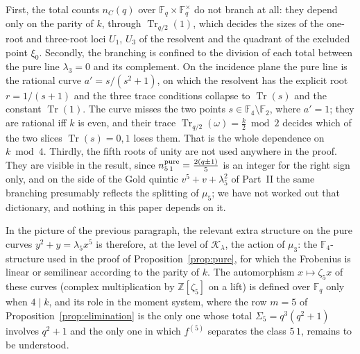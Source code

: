 \documentclass[12pt,a4paper]{amsart}
\theoremstyle{definition}
\newcommand{\F}{\mathbb{F}}
\newcommand{\Z}{\mathbb{Z}}
\newcommand{\Tr}{\operatorname{Tr}}
\newcommand{\Kk}{\mathcal{K}}
\begin{document}
First, the total counts $n_C(q)$ over $\F_q\times\F_q^\times$ do not branch at all: they depend only on the parity of $k$, through $\Tr_{q/2}(1)$, which decides the sizes of the one-root and three-root loci $U_1$, $U_3$ of the resolvent and the quadrant of the excluded point $\xi_0$. Secondly, the branching is confined to the division of each total between the pure line $\lambda_3=0$ and its complement. On the incidence plane the pure line is the rational curve $a'=s/(s^2+1)$, on which the resolvent has the explicit root $r=1/(s+1)$ and the three trace conditions collapse to $\Tr(s)$ and the constant $\Tr(1)$. The curve misses the two points $s\in\F_4\setminus\F_2$, where $a'=1$; they are rational iff $k$ is even, and their trace $\Tr_{q/2}(\omega)=\frac k2\bmod2$ decides which of the two slices $\Tr(s)=0,1$ loses them. That is the whole dependence on $k\bmod4$. Thirdly, the fifth roots of unity are not used anywhere in the proof. They are visible in the result, since $n^{\rm pure}_{5\,1}=\frac{2(q\pm1)}5$ is an integer for the right sign only, and on the side of the Gold quintic $v^5+v+\lambda_5^2$ of Part~II the same branching presumably reflects the splitting of $\mu_5$; we have not worked out that dictionary, and nothing in this paper depends on it.

In the picture of the previous paragraph, the relevant extra structure on the pure curves $y^2+y=\lambda_5x^5$ is therefore, at the level of $\Kk_\lambda$, the action of $\mu_3$: the $\F_4$-structure used in the proof of Proposition~\ref{prop:pure}, for which the Frobenius is linear or semilinear according to the parity of $k$. The automorphism $x\mapsto\zeta_5x$ of these curves (complex multiplication by $\Z[\zeta_5]$ on a lift) is defined over $\F_q$ only when $4\mid k$, and its role in the moment system, where the row $m=5$ of Proposition~\ref{prop:elimination} is the only one whose total $\Sigma_5=q^3(q^2+1)$ involves $q^2+1$ and the only one in which $f^{(5)}$ separates the class $5\,1$, remains to be understood.
\end{document}
